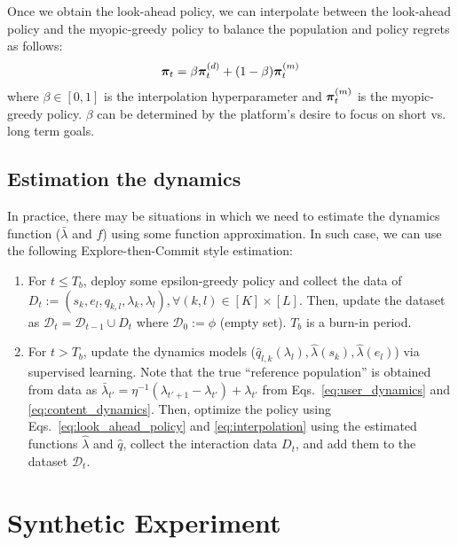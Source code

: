 Once we obtain the look-ahead policy, we can interpolate between the look-ahead policy and the myopic-greedy policy to balance the population and policy regrets as follows:
\begin{align}
    \bm{\pi}_t = \beta \bm{\pi}_t^{(d)} + (1 - \beta) \bm{\pi}_t^{(m)} \label{eq:interpolation}
\end{align}
where $\beta \in [0, 1]$ is the interpolation hyperparameter and $\bm{\pi}_t^{(m)}$ is the myopic-greedy policy. 
$\beta$ can be determined by the platform's desire to focus on short vs. long term goals.

\subsection{Estimation the dynamics} \label{sec:dyanmics_estimation}
 
In practice, there may be situations in which we need to estimate the dynamics function ($\bar{\lambda}$ and $f$) using some function approximation. In such case, we can use the following Explore-then-Commit style estimation:
\begin{enumerate}
    \item For $t \leq T_b$, deploy some epsilon-greedy policy and collect the data of $D_t := (s_k, e_l, q_{k,l}, \lambda_k, \lambda_l),  \forall (k, l) \in [K] \times [L]$. Then, update the dataset as $\mathcal{D}_t = \mathcal{D}_{t-1} \cup D_t$ where $\mathcal{D}_0 := \phi$ (empty set). $T_b$ is a burn-in period.
    \item For $t > T_b$, update the dynamics models ($\widehat{q}_{l,k}(\lambda_{l}), \widehat{\lambda}(s_{k}), \widehat{\lambda}(e_{l})$) via supervised learning. 
    Note that the true ``reference population'' is obtained from data as $\bar{\lambda}_{t'} = \eta^{-1} (\lambda_{t'+1} - \lambda_{t'}) + \lambda_{t'}$ from  Eqs.~\eqref{eq:user_dynamics} and \eqref{eq:content_dynamics}.
    Then, optimize the policy using Eqs.~\eqref{eq:look_ahead_policy} and \eqref{eq:interpolation} using the estimated functions $\widehat{\lambda}$ and $\widehat{q}$, collect the interaction data $D_t$, and add them to the dataset $\mathcal{D}_{t}$.
\end{enumerate}

\section{Synthetic Experiment} \label{sec:synthetic_experiment}

